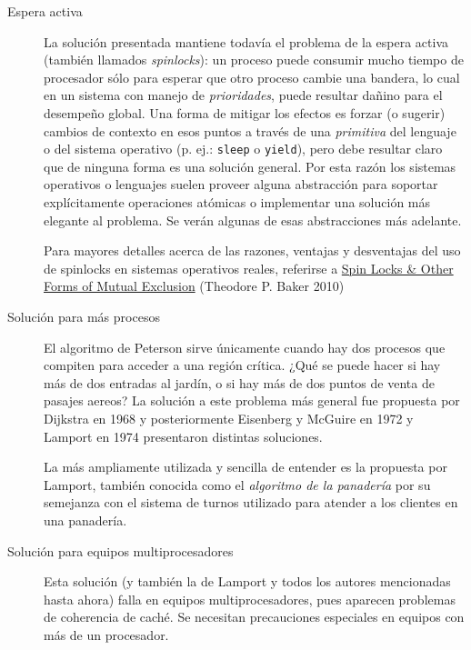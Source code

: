 \documentclass[11pt,fleqn]{book} %
\begin{document}
\begin{description}
\item[Espera activa] La solución presentada mantiene todavía el problema
                   de la espera activa (también llamados \emph{spinlocks}):
                   un proceso puede consumir mucho tiempo de
                   procesador sólo para esperar que otro proceso
                   cambie una bandera, lo cual en un sistema con
                   manejo de \emph{prioridades}, puede resultar dañino para
                   el desempeño global. Una forma de
                   mitigar los efectos es forzar (o sugerir) cambios
                   de contexto en esos puntos a través de una
                   \emph{primitiva} del lenguaje o del sistema operativo
                   (p. ej.: \texttt{sleep} o \texttt{yield}), pero debe resultar
                   claro que de ninguna forma es una solución
                   general. Por esta razón los sistemas operativos o
                   lenguajes suelen proveer alguna abstracción para
                   soportar explícitamente operaciones atómicas o
                   implementar una solución más elegante al
                   problema. Se verán algunas de esas abstracciones
                   más adelante.

		   Para mayores detalles acerca de las razones, ventajas y desventajas
                   del uso de spinlocks en sistemas operativos reales,
                   referirse a \href{http://www.cs.fsu.edu/~baker/devices/notes/spinlock.html}{Spin Locks \& Other Forms of Mutual Exclusion} (Theodore P. Baker 2010)
\end{description}


\begin{description}
\item[Solución para más procesos] El algoritmo de Peterson sirve
     únicamente cuando hay dos procesos que compiten para acceder a
     una región crítica. ¿Qué se puede hacer si hay más de dos
     entradas al jardín, o si hay más de dos puntos de venta de
     pasajes aereos? La solución a este problema más general fue
     propuesta por Dijkstra en 1968 y posteriormente Eisenberg y
     McGuire en 1972 y Lamport en 1974 presentaron distintas
     soluciones.

     La más ampliamente utilizada y sencilla de entender
     es la propuesta por Lamport, también conocida como el \emph{algoritmo      de la panadería} por su semejanza con el sistema de turnos
     utilizado para atender a los clientes en una panadería.
\item[Solución para equipos multiprocesadores] Esta solución (y también la de
     Lamport y todos los autores mencionadas hasta ahora) falla en equipos
     multiprocesadores, pues aparecen problemas de coherencia de
     caché. Se necesitan precauciones especiales en equipos con más de
     un procesador.
\end{description}
\end{document}

